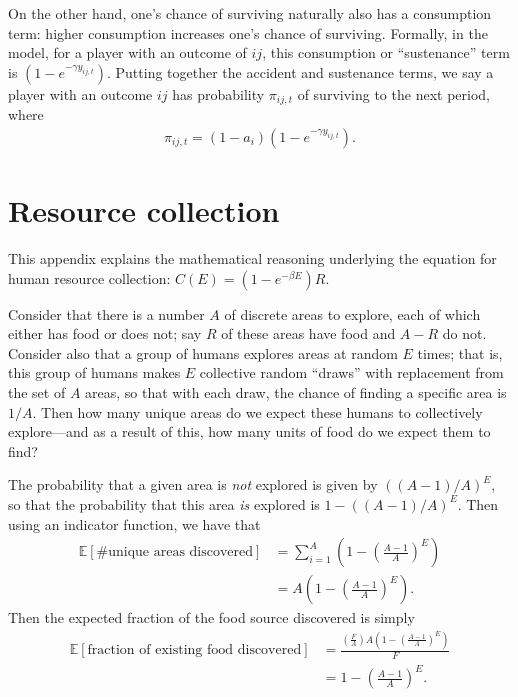 \documentclass[12pt,reqno]{amsart}
\begin{document}
On the other hand, one's chance of surviving naturally also has a consumption term: higher consumption increases one's chance of surviving. Formally, in the model, for a player with an outcome of $ij$, this consumption or ``sustenance'' term is $(1 - e^{-\gamma y_{ij,t}})$. Putting together the accident and sustenance terms, we say a player with an outcome $ij$ has probability $\pi_{ij,t}$ of surviving to the next period, where
\begin{align} \label{surv_probability}
\pi_{ij,t} = \left(1 - a_i\right)\left(1 - e^{-\gamma y_{ij,t}}\right).
\end{align}













\newpage
\appendix

\section{Resource collection} \label{resource_appendix}

This appendix explains the mathematical reasoning underlying the equation for human resource collection: $C(E) = (1-e^{-\beta E})R$.

Consider that there is a number $A$ of discrete areas to explore, each of which either has food or does not; say $R$ of these areas have food and $A - R$ do not. Consider also that a group of humans explores areas at random $E$ times; that is, this group of humans makes $E$ collective random ``draws'' with replacement from the set of $A$ areas, so that with each draw, the chance of finding a specific area is $1/A$. Then how many unique areas do we expect these humans to collectively explore---and as a result of this, how many units of food do we expect them to find?

The probability that a given area is \emph{not} explored is given by $((A-1)/A)^E$, so that the probability that this area \emph{is} explored is $1 - ((A-1)/A)^E$. Then using an indicator function, we have that
\begin{align*} \label{}
\mathbb{E}[\textrm{\# unique areas discovered}] &= \sum_{i=1}^A\left(1-\left(\frac{A-1}{A}\right)^E\right) \\
									&= A\left(1-\left(\frac{A-1}{A}\right)^E\right).
\end{align*}
Then the expected fraction of the food source discovered is simply
\begin{align*} \label{}
\mathbb{E}[\textrm{fraction of existing food discovered}] &= \frac{\left(\frac{F}{A}\right)A\left(1-\left(\frac{A-1}{A}\right)^E\right)}{F} \\
									&= 1-\left(\frac{A-1}{A}\right)^E.
\end{align*}
\end{document}

